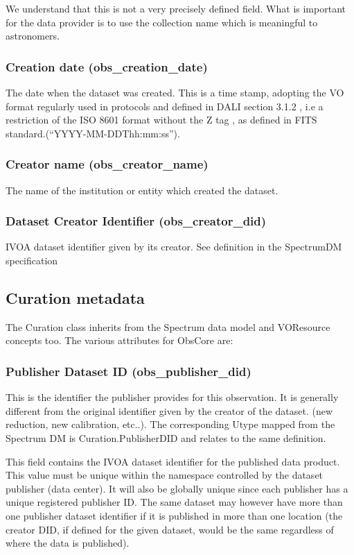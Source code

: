 \documentclass[11pt,a4paper]{ivoa}
\begin{document}
We understand that this is not a very precisely defined field. What is important for the data provider is to use the
collection name which is meaningful to astronomers.

\subsubsection{Creation date (obs\_creation\_date)}
The date when the dataset was created. This is a time stamp, adopting the VO format regularly used in protocols and
defined in DALI \citep{2013ivoa.spec.1129D} section 3.1.2 , i.e a restriction of the ISO 8601 format without the Z tag ,
as defined in FITS standard.(``YYYY-MM-DDThh:mm:ss'').

\subsubsection{Creator name (obs\_creator\_name)}
The name of the institution or entity which created the dataset.

\subsubsection{Dataset  Creator Identifier (obs\_creator\_did)}
IVOA dataset identifier given by its creator. See definition in the SpectrumDM specification \citep{2007ivoa.spec.1029M}

\subsection{Curation metadata}
The Curation class inherits from the Spectrum data model and VOResource concepts too.  The various attributes for
ObsCore are:

\subsubsection{Publisher Dataset ID (obs\_publisher\_did)}
This is the identifier the publisher provides for this observation. It is generally different from the original
identifier given by the creator of the dataset. (new reduction, new calibration, etc..).  The corresponding Utype
mapped from the Spectrum DM is Curation.PublisherDID and relates to the same definition.

This field contains the IVOA dataset identifier \citep{2007ivoa.spec.0314P} for the published data product. This value
must be unique within the namespace controlled by the dataset publisher (data center).  It will also be globally unique
since each publisher has a unique registered publisher ID.  The same dataset may however have more than one publisher
dataset identifier if it is published in more than one location (the creator DID, if defined for the given dataset,
would be the same regardless of where the data is published).
\end{document}

